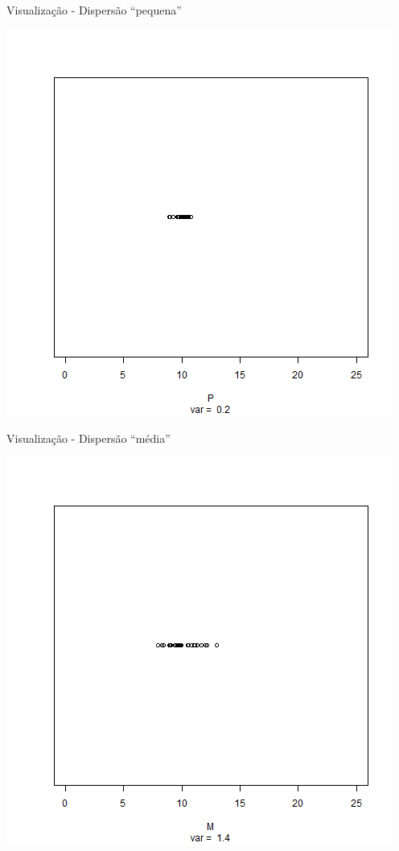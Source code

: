 \documentclass{beamer}
\begin{document}
\begin{frame}{\small Visualização - Dispersão ``pequena''}
  \begin{center}
    \includegraphics[height=.8\textheight]{Cap17/dot-P}
  \end{center}
\end{frame}

\begin{frame}{\small Visualização - Dispersão ``média''}
  \begin{center}
    \includegraphics[height=.8\textheight]{Cap17/dot-M}
  \end{center}
\end{frame}
\end{document}
